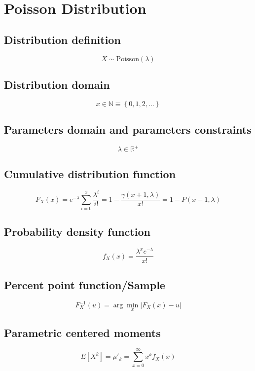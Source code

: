 \documentclass{article}
\begin{document}
\newpage
\section{Poisson Distribution}
\subsection{Distribution definition}
\begin{equation*} X\sim\mathrm{Poisson}\left(\lambda\right) \end{equation*}
\subsection{Distribution domain}
\begin{equation*} x\in\mathbb{N}\equiv \left\{0,1,2,\dots\right\} \end{equation*}
\subsection{Parameters domain and parameters constraints}
\begin{equation*} \lambda\in\mathbb{R}^{+} \end{equation*}
\subsection{Cumulative distribution function}
\begin{equation*} F_{X}\left(x\right)=e^{-\lambda} \sum_{i=0}^{x} \frac{\lambda^i}{i!}=1-\frac{\gamma(x+1, \lambda)}{x!}=1-P(x-1,\lambda) \end{equation*}
\subsection{Probability density function}
\begin{equation*} f_{X}\left(x\right)=\frac{\lambda^x e^{-\lambda}}{x!} \end{equation*}
\subsection{Percent point function/Sample}
\begin{equation*} F^{-1}_{X}\left(u\right)=\arg\min_{x}\left| F_{X}\left(x\right)-u \right| \end{equation*}
\subsection{Parametric centered moments}
\begin{equation*} E[X^k]=\mu'_{k}=\sum_{x=0}^{\infty}x^{k}f_{X}\left(x\right) \end{equation*}
\end{document}
